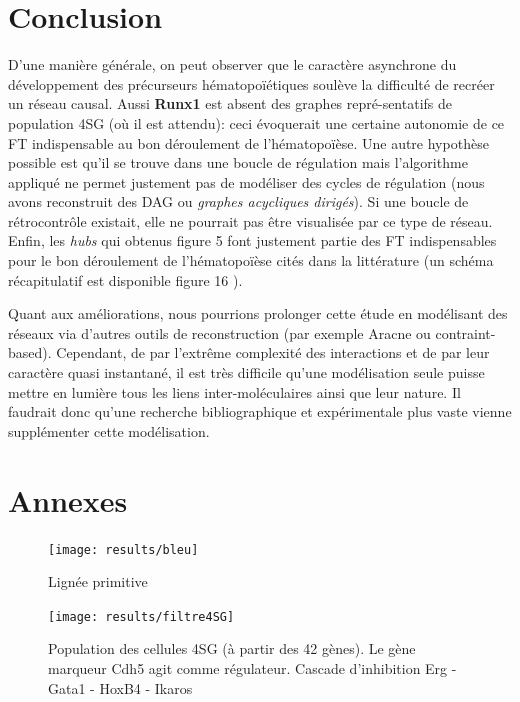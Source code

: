 \documentclass[fleqn,11pt]{SelfArx} %
\providecommand\phantomsection{}
\begin{document}
\section*{Conclusion}
D'une manière générale, on peut observer que le caractère asynchrone du développement des précurseurs hématopoïétiques soulève la difficulté de recréer un réseau causal. Aussi \textbf{Runx1} est absent des graphes repré-sentatifs de population 4SG (où il est attendu): ceci évoquerait une certaine autonomie de ce FT indispensable au bon déroulement de l'hématopoïèse. Une autre hypothèse possible est qu'il se trouve dans une boucle de régulation mais l'algorithme appliqué ne permet justement pas de modéliser des cycles de régulation (nous avons reconstruit des DAG ou \textit{graphes acycliques dirigés}). Si une boucle de rétrocontrôle existait, elle ne pourrait pas être visualisée par ce type de réseau. Enfin, les \textit{hubs} qui obtenus figure 5 font justement partie des FT indispensables pour le bon déroulement de l'hématopoïèse cités dans la littérature\cite{Marcelo} (un schéma récapitulatif est disponible figure 16 \cite{Chen}).

\par Quant aux améliorations, nous pourrions prolonger cette étude en modélisant des réseaux via d'autres outils de reconstruction (par exemple Aracne ou contraint-based). Cependant, de par l'extrême complexité des interactions et de par leur caractère quasi instantané, il est très difficile qu'une modélisation seule puisse mettre en lumière tous les liens inter-moléculaires ainsi que leur nature. Il faudrait donc qu'une recherche bibliographique et expérimentale plus vaste vienne supplémenter cette modélisation. 



\phantomsection




\section*{Annexes}

\begin{figure}[ht]
\centering
\texttt{[image: results/bleu]}
\caption{Lignée primitive}
\label{fig:PS}
\end{figure}

\begin{figure}[ht]
\centering
\texttt{[image: results/filtre4SG]}
\caption{Population des cellules 4SG (à partir des 42 gènes). Le gène marqueur Cdh5 agit comme régulateur. Cascade d'inhibition Erg - Gata1 - HoxB4 - Ikaros}
\label{fig:pop4SG}
\end{figure}
\end{document}

